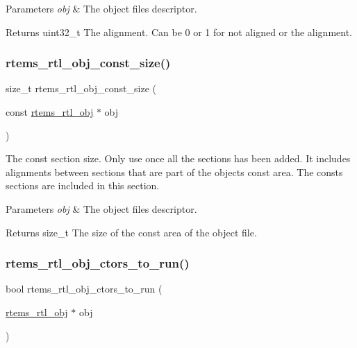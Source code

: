 \begin{DoxyParams}{Parameters}
{\em obj} & The object file\textquotesingle{}s descriptor. \\
\hline
\end{DoxyParams}
\begin{DoxyReturn}{Returns}
uint32\+\_\+t The alignment. Can be 0 or 1 for not aligned or the alignment. 
\end{DoxyReturn}
\mbox{\label{rtl-obj_8h_a2ce7672560ab13914b32a683650c03cf}} 
\subsubsection{\texorpdfstring{rtems\_rtl\_obj\_const\_size()}{rtems\_rtl\_obj\_const\_size()}}
{\footnotesize\ttfamily size\+\_\+t rtems\+\_\+rtl\+\_\+obj\+\_\+const\+\_\+size (\begin{DoxyParamCaption}\item[{const \mbox{\hyperlink{structrtems__rtl__obj}{rtems\+\_\+rtl\+\_\+obj}} $\ast$}]{obj }\end{DoxyParamCaption})}

The const section size. Only use once all the sections has been added. It includes alignments between sections that are part of the object\textquotesingle{}s const area. The consts sections are included in this section.


\begin{DoxyParams}{Parameters}
{\em obj} & The object file\textquotesingle{}s descriptor. \\
\hline
\end{DoxyParams}
\begin{DoxyReturn}{Returns}
size\+\_\+t The size of the const area of the object file. 
\end{DoxyReturn}
\mbox{\label{rtl-obj_8h_a1d4c73beba22bae24a66704baa5a8e5a}} 
\subsubsection{\texorpdfstring{rtems\_rtl\_obj\_ctors\_to\_run()}{rtems\_rtl\_obj\_ctors\_to\_run()}}
{\footnotesize\ttfamily bool rtems\+\_\+rtl\+\_\+obj\+\_\+ctors\+\_\+to\+\_\+run (\begin{DoxyParamCaption}\item[{\mbox{\hyperlink{structrtems__rtl__obj}{rtems\+\_\+rtl\+\_\+obj}} $\ast$}]{obj }\end{DoxyParamCaption})}

